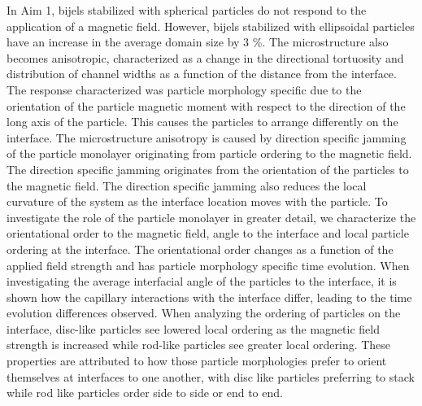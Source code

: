 In Aim 1, bijels stabilized with spherical particles do not respond to the application of a magnetic field. However, bijels stabilized
with ellipsoidal particles have an increase in the average domain size by 3 \%. The microstructure also becomes anisotropic, 
characterized as a change in the directional tortuosity and distribution of channel widths as a function of the distance from the 
interface. The response characterized was particle morphology specific due to the orientation of the particle magnetic moment with 
respect to the direction of the long axis of the particle. This causes the particles to arrange differently on the interface. The 
microstructure anisotropy is caused by direction specific jamming of the particle monolayer originating from particle ordering to 
the magnetic field. The direction specific jamming originates from the orientation of the particles to the magnetic field. The direction
specific jamming also reduces the local curvature of the system as the interface location moves with the particle.
To investigate the role of the particle monolayer in greater detail, we characterize the orientational order to the magnetic field,
angle to the interface and local particle ordering at the interface. The orientational order changes as a function of the applied field 
strength and has particle morphology specific time evolution. When investigating the average interfacial angle of the particles to the 
interface, it is shown how the capillary interactions with the interface differ, leading to the time evolution differences observed.
When analyzing the ordering of particles on the interface, disc-like particles see lowered local ordering as the magnetic field strength is 
increased while rod-like particles see greater local ordering. These properties are attributed to how those particle morphologies prefer 
to orient themselves at interfaces to one another, with disc like particles preferring to stack while rod like particles order side to side 
or end to end.

